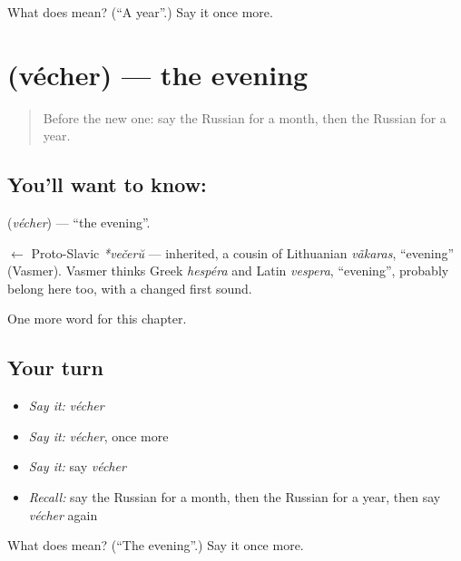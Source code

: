 \begin{tcolorbox}[breakable,colback=teal!4,colframe=teal!35!black,title={Before you move on}]
What does  mean? (\textquotedblleft{}A year\textquotedblright{}.) Say it once more.
\end{tcolorbox}
\section[\texorpdfstring{\ru{вечер} (vécher)}{вечер (vécher)}]{ (vécher) — the evening}

\label{lesson:RU-C68-evening}



\begin{quote}
Before the new one: say the Russian for a month, then the Russian for a year.
\end{quote}

\subsection*{You'll want to know: }
\textbf{} (\emph{vécher}) — \textquotedblleft{}the evening\textquotedblright{}.

\begin{cousinweb}
\textbf{} $\leftarrow$ Proto-Slavic \emph{*večerŭ} — inherited, a cousin of Lithuanian \emph{vãkaras}, \textquotedblleft{}evening\textquotedblright{} (Vasmer). Vasmer thinks Greek \emph{hespéra} and Latin \emph{vespera}, \textquotedblleft{}evening\textquotedblright{}, probably belong here too, with a changed first sound.
\end{cousinweb}

\begin{grammarlens}[title={What you've built}]
One more word for this chapter.
\end{grammarlens}

\subsection*{Your turn}
\begin{itemize}
\raggedright
  \item \emph{Say it:} \emph{vécher}
  \item \emph{Say it:} \emph{vécher}, once more
  \item \emph{Say it:} say \emph{vécher}
  \item \emph{Recall:} say the Russian for a month, then the Russian for a year, then say \emph{vécher} again
\end{itemize}

\begin{tcolorbox}[breakable,colback=teal!4,colframe=teal!35!black,title={Before you move on}]
What does  mean? (\textquotedblleft{}The evening\textquotedblright{}.) Say it once more.
\end{tcolorbox}
